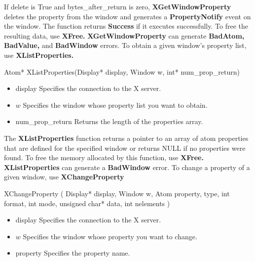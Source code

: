 \documentclass{report}
\begin{document}
\begin{itemize}
        \bigbreak \noindent 
        If delete is True and bytes\_after\_return is zero, \textbf{XGetWindowProperty} deletes the property
        from the window and generates a \textbf{PropertyNotify} event on the window.
        \bigbreak \noindent 
        The function returns \textbf{Success} if it executes successfully. To free the resulting data, use \textbf{XFree.}
        \bigbreak \noindent 
        \textbf{XGetWindowProperty} can generate \textbf{BadAtom,} \textbf{BadValue,} and \textbf{BadWindow} errors.
        \bigbreak \noindent 
        To obtain a given window’s property list, use \textbf{XListProperties.}
        \bigbreak \noindent 
        \begin{cppcode}
            Atom* XListProperties(Display* display, Window w, int* num_prop_return)
        \end{cppcode}
        \bigbreak \noindent
        \begin{itemize}
            \item display Specifies the connection to the X server.
            \item $w$ Specifies the window whose property list you want to obtain.
            \item num\_prop\_return Returns the length of the properties array.
        \end{itemize}
        The \textbf{XListProperties} function returns a pointer to an array of atom properties that are defined for the specified window or returns NULL if no properties were found. To free the memory allocated by this function, use \textbf{XFree.}
        \bigbreak \noindent 
        \textbf{XListProperties} can generate a \textbf{BadWindow} error.
        \bigbreak \noindent 
        To change a property of a given window, use \textbf{XChangeProperty}
        \bigbreak \noindent 
        \begin{cppcode}
            XChangeProperty (
                Display* display,
                Window w,
                Atom property, type,
                int format,
                int mode,
                unsigned char* data,
                int nelements
            )
        \end{cppcode}
        \bigbreak \noindent
        \begin{itemize}
            \item display Specifies the connection to the X server.
            \item $w$ Specifies the window whose property you want to change.
            \item property Specifies the property name.

\end{itemize}
\end{itemize}
\end{document}
